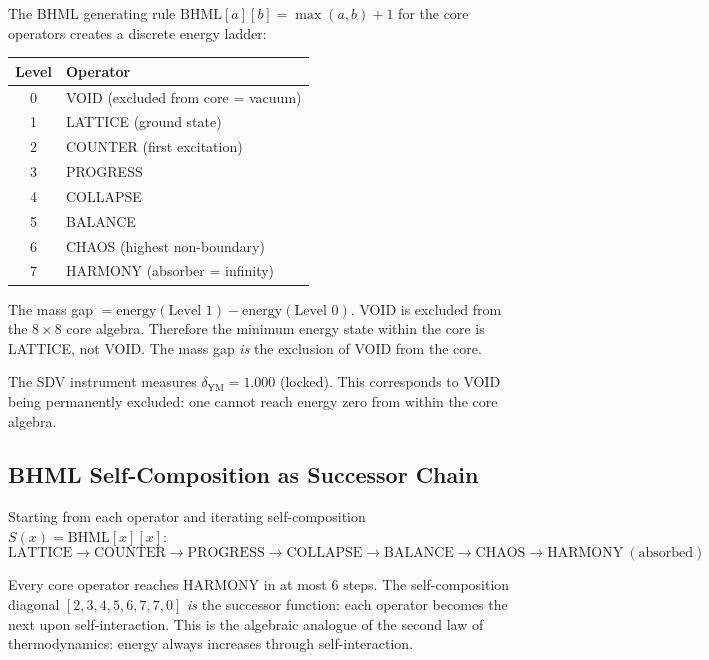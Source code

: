 \documentclass[11pt]{article}
\begin{document}
The BHML generating rule $\mathrm{BHML}[a][b] = \max(a,b) + 1$ for
the core operators creates a discrete energy ladder:

\begin{center}
\begin{tabular}{cl}
\toprule
\textbf{Level} & \textbf{Operator} \\
\midrule
0 & VOID (excluded from core = vacuum) \\
1 & LATTICE (ground state) \\
2 & COUNTER (first excitation) \\
3 & PROGRESS \\
4 & COLLAPSE \\
5 & BALANCE \\
6 & CHAOS (highest non-boundary) \\
7 & HARMONY (absorber = infinity) \\
\bottomrule
\end{tabular}
\end{center}

The mass gap $= \mathrm{energy}(\text{Level 1}) -
\mathrm{energy}(\text{Level 0})$. VOID is excluded from the
$8\times 8$ core algebra. Therefore the minimum energy state within
the core is LATTICE, not VOID. The mass gap \emph{is} the exclusion
of VOID from the core.

The SDV instrument measures $\delta_{\mathrm{YM}} = 1.000$ (locked).
This corresponds to VOID being permanently excluded: one cannot reach
energy zero from within the core algebra.

\subsection{BHML Self-Composition as Successor Chain}
\label{ssec:successor-chain}

Starting from each operator and iterating self-composition
$S(x) = \mathrm{BHML}[x][x]$:
\[
  \text{LATTICE} \to \text{COUNTER} \to \text{PROGRESS}
  \to \text{COLLAPSE} \to \text{BALANCE} \to \text{CHAOS}
  \to \text{HARMONY}\ (\text{absorbed})
\]

Every core operator reaches HARMONY in at most 6 steps. The
self-composition diagonal $[2, 3, 4, 5, 6, 7, 7, 0]$ \emph{is} the
successor function: each operator becomes the next upon
self-interaction. This is the algebraic analogue of the second law of
thermodynamics: energy always increases through self-interaction.
\end{document}
